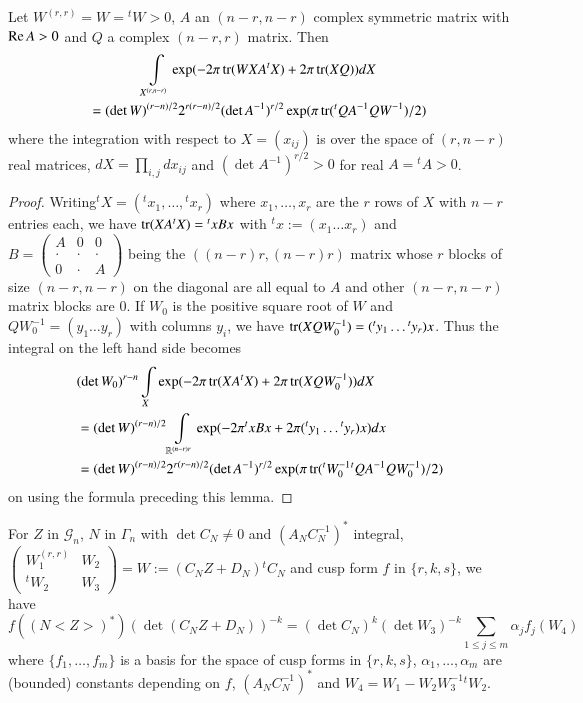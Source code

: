 \begin{sublemma}\label{c1:lem-1.6.16}
Let $W^{(r,r)}=W={}^{t}W>0$, $A$ an $(n-r,n-r)$ complex symmetric
matrix with $\text{Re\,}A>0$ and $Q$ a complex $(n-r,r)$ matrix. Then
\begin{multline*}
\int\limits_{X^{(r,n-r)}}\exp(-2\pi \operatorname{tr}(WXA{}^{t}X)+2\pi \operatorname{tr}(XQ))dX\\
=(\det W)^{(r-n)/2}2^{r(r-n)/2}(\det A^{-1})^{r/2}\exp(\pi
\operatorname{tr}({}^{t}QA^{-1}QW^{-1})/2) 
\end{multline*}
where the integration with respect to $X=(x_{ij})$ is over the space
of $(r,n-r)$ real matrices, $dX=\prod\limits_{i,j}dx_{ij}$ and $(\det
A^{-1})^{r/2}>0$ for real $A={}^{t}A>0$.
\end{sublemma}

\begin{proof}
Writing\pageoriginale ${}^{t}X=({}^{t}x_{1},\ldots,{}^{t}x_{r})$ where
$x_{1},\ldots,x_{r}$ are the $r$ rows of $X$ with $n-r$ entries each,
we have $\operatorname{tr}(XA{}^{t}X)={}^{t}xBx$ with ${}^{t}x:=(x_{1}\ldots x_{r})$
and $B=\left(\begin{smallmatrix} A & 0 & 0\\ \cdot & \cdot & \cdot\\ 0
  & \cdot & A\end{smallmatrix}\right)$ being the $((n-r)r,(n-r)r)$
  matrix whose $r$ blocks of size $(n-r,n-r)$ on the diagonal are all
  equal to $A$ and other $(n-r,n-r)$ matrix blocks are $0$. If $W_{0}$
  is the positive square root of $W$ and $QW^{-1}_{0}=(y_{1}\ldots
  y_{r})$ with columns $y_{i}$, we have
  $\operatorname{tr}(XQW^{-1}_{0})=({}^{t}y_{1}\ldots {}^{t}y_{r})x$. Thus the
  integral on the left hand side becomes
\begin{align*}
& (\det W_{0})^{r-n}\int\limits_{X}\exp(-2\pi \operatorname{tr}(XA{}^{t}X)+2\pi
  \operatorname{tr}(XQW^{-1}_{0}))dX\\
&= (\det W)^{(r-n)/2}\int\limits_{\mathbb{R}^{(n-r)r}} \exp(-2\pi
     {}^{t}xBx+2\pi({}^{t}y_{1}\ldots {}^{t}y_{r})x)dx\\
&= (\det W)^{(r-n)/2}2^{r(r-n)/2}(\det A^{-1})^{r/2}\exp (\pi
     \operatorname{tr}({}^{t}W^{-1}_{0}{}^{t}QA^{-1}QW^{-1}_{0})/2) 
\end{align*}
on using the formula preceding this lemma.
\end{proof}

\begin{sublemma}\label{c1:lem-1.6.17}
For $Z$ in $\mathscr{G}_{n}$, $N$ in $\Gamma_{n}$ with $\det C_{N}\neq
0$ and $(A_{N}C^{-1}_{N})^{\ast}$ integral, $\left(\begin{smallmatrix}
  W^{(r,r)}_{1} & W_{2}\\ {}^{t}W_{2} & W_{3}
\end{smallmatrix}\right)=W:=(C_{N}Z+D_{N}){}^{t}C_{N}$ and cusp form
$f$ in $\{r,k,s\}$, we have
$$
f((N<Z>)^{\ast})(\det (C_{N}Z+D_{N}))^{-k}=(\det C_{N})^{k}(\det
W_{3})^{-k}\sum\limits_{1\leq j\leq m}\alpha_{j}f_{j}(W_{4}) 
$$
where $\{f_{1},\ldots,f_{m}\}$ is a basis for the space of cusp forms
in $\{r,k,s\}$, $\alpha_{1},\ldots,\alpha_{m}$ are (bounded) constants
depending on $f$, $(A_{N}C^{-1}_{N})^{\ast}$ and
$W_{4}=W_{1}-W_{2}W^{-1}_{3}{}^{t}W_{2}$. 
\end{sublemma}

